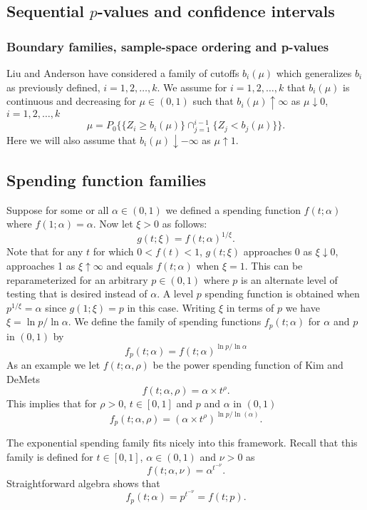 \subsection{Sequential $p$-values and confidence intervals}
\subsubsection{Boundary families, sample-space ordering and p-values}
Liu and Anderson \cite{AdaptExtend} have considered a family of cutoffs $b_i(\mu)$ 
which generalizes $b_i$ as previously defined, $i=1,2,\ldots,k.$
We assume for $i=1,2,\ldots,k$ that $b_i(\mu)$ is continuous and decreasing for $\mu\in(0,1)$ such that $b_i(\mu)\uparrow \infty$ as $\mu\downarrow 0$, $i=1,2,\ldots,k$
\begin{equation}
\mu=P_{0}\{\{Z_{i}\geq b_{i}(\mu)\}\cap_{j=1}^{i-1}%
\{Z_{j}<b_{j}(\mu)\}\}\label{eq:mu}.%
\end{equation}
Here we will also assume that $b_i(\mu)\downarrow -\infty$ as $\mu\uparrow 1$.


\subsection{Spending function families}
Suppose for some or all $\alpha\in (0,1)$ we defined a spending function $f(t;\alpha)$ where $f(1;\alpha)=\alpha$.
Now let $\xi>0$ as follows:
$$g(t;\xi)=f(t;\alpha)^{1/\xi}.$$ 
Note that for any $t$ for which $0<f(t)<1$, $g(t;\xi)$ approaches 0 as $\xi\downarrow 0$, approaches 1 as $\xi\uparrow \infty$ and equals $f(t;\alpha)$ when $\xi=1$. 
This can be reparameterized for an arbitrary $p\in (0,1)$ where $p$ is an alternate level of testing that is desired instead of $\alpha$.
A level $p$ spending function is obtained when $p^{1/\xi}=\alpha$ since $g(1;\xi)=p$ in this case. 
Writing $\xi$ in terms of $p$ we have $\xi=\ln p / \ln \alpha$.
We define the family of spending functions $f_p(t;\alpha)$ for $\alpha$ and $p$ in $(0, 1)$ by
\begin{equation}
f_p(t; \alpha)=f(t;\alpha)^{\ln p/\ln \alpha}
\end{equation}
As an example we let $f(t;\alpha, \rho)$ be the power spending function of Kim and DeMets \cite{KimDeMets}
$$f(t;\alpha,\rho)=\alpha\times t^\rho.$$
This implies that for $\rho>0$, $t\in [0,1]$ and $p$ and $\alpha$ in $(0,1)$
$$f_p(t;\alpha,\rho)=(\alpha\times t^\rho)^{\ln p/\ln(\alpha)}.$$

The exponential spending family fits nicely into this framework.
Recall that this family is defined for $t\in [0,1]$, $\alpha\in(0,1)$ and $\nu>0$ as
$$f(t;\alpha,\nu)=\alpha^{t^{-\nu}}.$$
Straightforward algebra shows that
$$f_p(t;\alpha)=p^{t^{-\nu}}=f(t;p).$$
